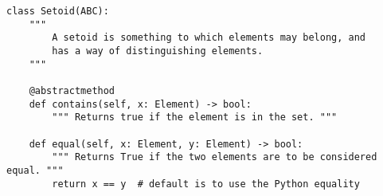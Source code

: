 \par\begin{minipage}{76ex}
\begin{verbatim}
class Setoid(ABC):
    """
        A setoid is something to which elements may belong, and
        has a way of distinguishing elements.
    """

    @abstractmethod
    def contains(self, x: Element) -> bool:
        """ Returns true if the element is in the set. """

    def equal(self, x: Element, y: Element) -> bool:
        """ Returns True if the two elements are to be considered equal. """
        return x == y  # default is to use the Python equality
\end{verbatim}
\end{minipage}\par